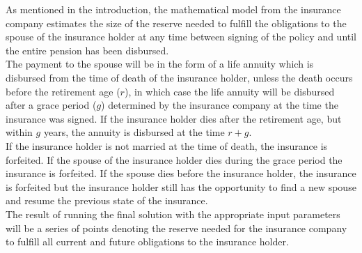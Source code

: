 As mentioned in the introduction, the mathematical model from the insurance company estimates the size of the reserve needed to fulfill the obligations to the spouse of the insurance holder at any time between signing of the policy and until the entire pension has been disbursed.\\ 

The payment to the spouse will be in the form of a life annuity which is disbursed from the time of death of the insurance holder, unless the death occurs before the retirement age ($r$), in which case the life annuity will be disbursed after a grace period ($g$) determined by the insurance company at the time the insurance was signed. If the insurance holder dies after the retirement age, but within $g$ years, the annuity is disbursed at the time $r + g$. \\

If the insurance holder is not married at the time of death, the insurance is forfeited. If the spouse of the insurance holder dies during the grace period the insurance is forfeited. If the spouse dies before the insurance holder, the insurance is forfeited but the insurance holder still has the opportunity to find a new spouse and resume the previous state of the insurance. \\


The result of running the final solution with the appropriate input parameters will be a series of points denoting the reserve needed for the insurance company to fulfill all current and future obligations to the insurance holder.